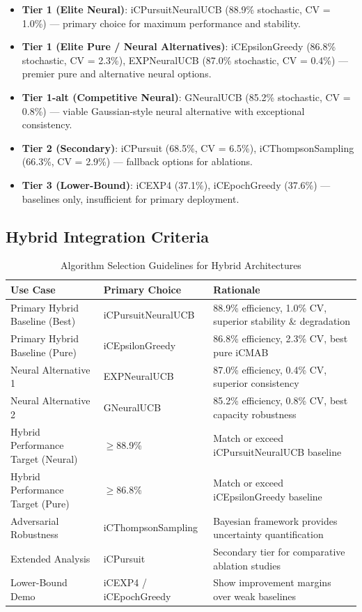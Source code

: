 \documentclass[12pt,a4paper]{article}
\begin{document}
\begin{itemize}
\item \textbf{Tier 1 (Elite Neural)}: iCPursuitNeuralUCB (88.9\% stochastic, CV = 1.0\%) --- primary choice for maximum performance and stability.
\item \textbf{Tier 1 (Elite Pure / Neural Alternatives)}: iCEpsilonGreedy (86.8\% stochastic, CV = 2.3\%), EXPNeuralUCB (87.0\% stochastic, CV = 0.4\%) --- premier pure and alternative neural options.
\item \textbf{Tier 1-alt (Competitive Neural)}: GNeuralUCB (85.2\% stochastic, CV = 0.8\%) --- viable Gaussian-style neural alternative with exceptional consistency.
\item \textbf{Tier 2 (Secondary)}: iCPursuit (68.5\%, CV = 6.5\%), iCThompsonSampling (66.3\%, CV = 2.9\%) --- fallback options for ablations.
\item \textbf{Tier 3 (Lower-Bound)}: iCEXP4 (37.1\%), iCEpochGreedy (37.6\%) --- baselines only, insufficient for primary deployment.
\end{itemize}

\subsection{Hybrid Integration Criteria}

\begin{table}[H]
\footnotesize
\centering
\caption{Algorithm Selection Guidelines for Hybrid Architectures}
\begin{tabular}{@{}lll@{}}
\toprule
\textbf{Use Case} & \textbf{Primary Choice} & \textbf{Rationale} \\
\midrule
Primary Hybrid Baseline (Best) & iCPursuitNeuralUCB & 88.9\% efficiency, 1.0\% CV, superior stability \& degradation \\
Primary Hybrid Baseline (Pure) & iCEpsilonGreedy & 86.8\% efficiency, 2.3\% CV, best pure iCMAB \\
Neural Alternative 1 & EXPNeuralUCB & 87.0\% efficiency, 0.4\% CV, superior consistency \\
Neural Alternative 2 & GNeuralUCB & 85.2\% efficiency, 0.8\% CV, best capacity robustness \\
Hybrid Performance Target (Neural) & $\geq$88.9\% & Match or exceed iCPursuitNeuralUCB baseline \\
Hybrid Performance Target (Pure) & $\geq$86.8\% & Match or exceed iCEpsilonGreedy baseline \\
Adversarial Robustness & iCThompsonSampling & Bayesian framework provides uncertainty quantification \\
Extended Analysis & iCPursuit & Secondary tier for comparative ablation studies \\
Lower-Bound Demo & iCEXP4 / iCEpochGreedy & Show improvement margins over weak baselines \\
\bottomrule
\end{tabular}
\end{table}
\end{document}
